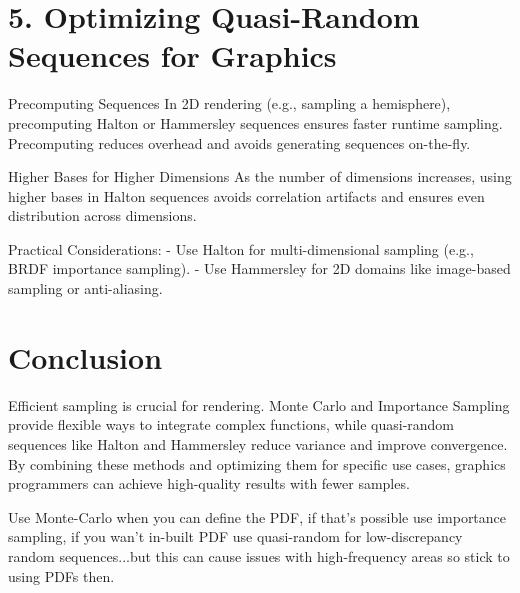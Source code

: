 \documentclass{article}
\begin{document}
\section*{5. Optimizing Quasi-Random Sequences for Graphics}

Precomputing Sequences
In 2D rendering (e.g., sampling a hemisphere), precomputing Halton or Hammersley sequences ensures faster runtime sampling. Precomputing reduces overhead and avoids generating sequences on-the-fly.

 Higher Bases for Higher Dimensions
As the number of dimensions increases, using higher bases in Halton sequences avoids correlation artifacts and ensures even distribution across dimensions.

Practical Considerations:
- Use Halton for multi-dimensional sampling (e.g., BRDF importance sampling).
- Use Hammersley for 2D domains like image-based sampling or anti-aliasing.

\section*{Conclusion}

Efficient sampling is crucial for rendering. Monte Carlo and Importance Sampling provide flexible ways to integrate complex functions, while quasi-random sequences like Halton and Hammersley reduce variance and improve convergence. By combining these methods and optimizing them for specific use cases, graphics programmers can achieve high-quality results with fewer samples.

Use Monte-Carlo when you can define the PDF, if that's possible use importance sampling, if you wan't in-built PDF use quasi-random for low-discrepancy random sequences...but this can cause issues with high-frequency areas so stick to using PDFs then.
\end{document}
